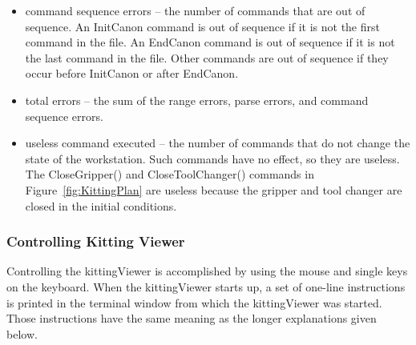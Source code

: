 \begin{itemize}
\item \sf command sequence errors \rm -- the number of commands that are
  out of sequence. An InitCanon command is out of sequence if it is not the
  first command in the file. An EndCanon command is out of sequence if it
  is not the last command in the file. Other commands are out of sequence
  if they occur before InitCanon or after EndCanon.\\

\item \sf total errors \rm -- the sum of the range errors, parse errors,
  and command sequence errors.\\

\item \sf useless command executed \rm -- the number of commands that do
  not change the state of the workstation. Such commands have no effect, so
  they are useless. The \sf CloseGripper() \rm and \sf CloseToolChanger()
  \rm commands in Figure~\ref{fig:KittingPlan} are useless because the
  gripper and tool changer are closed in the initial conditions.\\

\end{itemize}

\subsubsection{Controlling Kitting Viewer}
Controlling the kittingViewer is accomplished by using the mouse and single
keys on the keyboard. When the kittingViewer starts up, a set of one-line
instructions is printed in the terminal window from which the
kittingViewer was started. Those instructions have the same meaning as
the longer explanations given below.\\

